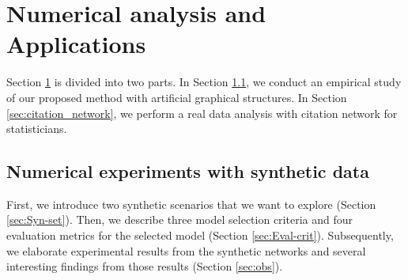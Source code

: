 \documentclass[AMS,STIX1COL]{WileyNJD-v2}
\begin{document}
{\section{ Numerical analysis and Applications}
\label{sec:Num-anal}
Section \ref{sec:Num-anal} is divided into two parts.
In Section \ref{sec:Syn-dat}, we conduct an empirical study of our proposed method with artificial graphical structures.
In Section \ref{sec:citation_network}, we perform a real data analysis with citation network for statisticians.


\subsection{Numerical experiments with synthetic data}
\label{sec:Syn-dat}
First, we introduce two synthetic scenarios that we want to explore (Section \ref{sec:Syn-set}).
Then, we describe three model selection criteria and four evaluation metrics for the selected model
(Section \ref{sec:Eval-crit}).
Subsequently, we elaborate experimental results from the synthetic networks and several interesting findings from those results (Section \ref{sec:obs}).

}
\end{document}
